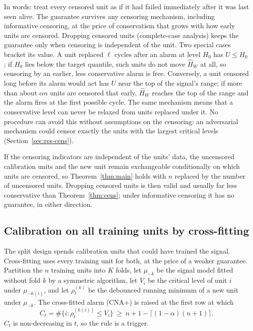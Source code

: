 In words: treat every censored unit as if it had failed immediately after it was last seen alive. The guarantee survives any censoring mechanism, including informative censoring, at the price of conservatism that grows with how early units are censored. Dropping censored units (complete-case analysis) keeps the guarantee only when censoring is independent of the unit. Two special cases bracket its value. A unit replaced $\ell$ cycles after an alarm at level $H_0$ has $U\le H_0$; if $H_0$ lies below the target quantile, such units do not move $\hat H_W$ at all, so censoring by an earlier, less conservative alarm is free. Conversely, a unit censored long before its alarm would act has $U$ near the top of the signal's range; if more than about $\alpha n$ units are censored that early, $\hat H_W$ reaches the top of the range and the alarm fires at the first possible cycle. The same mechanism means that a conservative level can never be relaxed from units replaced under it. No procedure can avoid this without assumptions on the censoring: an adversarial mechanism could censor exactly the units with the largest critical levels (Section~\ref{sec:res-cens}).

\begin{remark}\label{rem:cc}
If the censoring indicators are independent of the units' data, the uncensored calibration units and the new unit remain exchangeable conditionally on which units are censored, so Theorem~\ref{thm:main} holds with $n$ replaced by the number of uncensored units. Dropping censored units is then valid and usually far less conservative than Theorem~\ref{thm:cens}; under informative censoring it has no guarantee, in either direction.
\end{remark}

\subsection{Calibration on all training units by cross-fitting}

The split design spends calibration units that could have trained the signal. Cross-fitting uses every training unit for both, at the price of a weaker guarantee. Partition the $n$ training units into $K$ folds, let $\mu_{-k}$ be the signal model fitted without fold $k$ by a symmetric algorithm, let $V_i$ be the critical level of unit $i$ under $\mu_{-k(i)}$, and let $\rho^{(k)}_t$ be the debounced running minimum of a new unit under $\mu_{-k}$. The cross-fitted alarm (CNA+) is raised at the first row at which
\begin{equation}\label{eq:cvplus}
C_t=\#\{i:\rho^{(k(i))}_t\le V_i\}\ \ge\ n+1-\lceil(1-\alpha)(n+1)\rceil .
\end{equation}
$C_t$ is non-decreasing in $t$, so the rule is a trigger.

